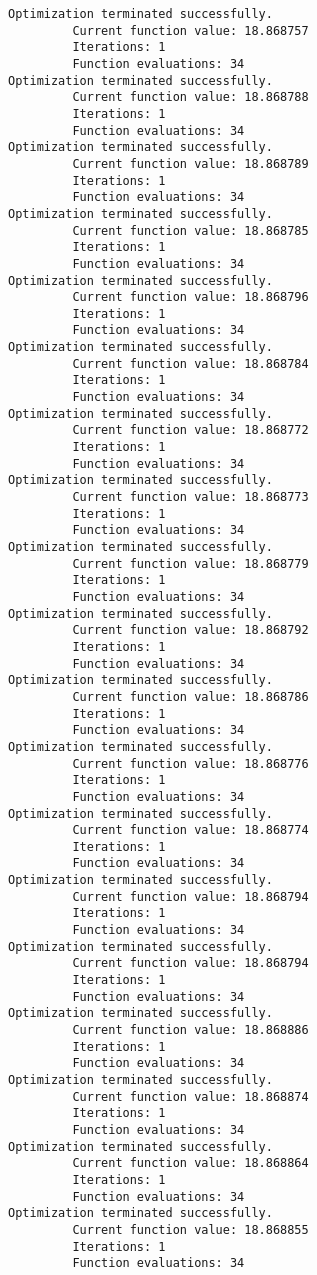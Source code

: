 \documentclass[11pt]{article}
\begin{document}
\begin{Verbatim}[commandchars=\\\{\}]
Optimization terminated successfully.
         Current function value: 18.868757
         Iterations: 1
         Function evaluations: 34
Optimization terminated successfully.
         Current function value: 18.868788
         Iterations: 1
         Function evaluations: 34
Optimization terminated successfully.
         Current function value: 18.868789
         Iterations: 1
         Function evaluations: 34
Optimization terminated successfully.
         Current function value: 18.868785
         Iterations: 1
         Function evaluations: 34
Optimization terminated successfully.
         Current function value: 18.868796
         Iterations: 1
         Function evaluations: 34
Optimization terminated successfully.
         Current function value: 18.868784
         Iterations: 1
         Function evaluations: 34
Optimization terminated successfully.
         Current function value: 18.868772
         Iterations: 1
         Function evaluations: 34
Optimization terminated successfully.
         Current function value: 18.868773
         Iterations: 1
         Function evaluations: 34
Optimization terminated successfully.
         Current function value: 18.868779
         Iterations: 1
         Function evaluations: 34
Optimization terminated successfully.
         Current function value: 18.868792
         Iterations: 1
         Function evaluations: 34
Optimization terminated successfully.
         Current function value: 18.868786
         Iterations: 1
         Function evaluations: 34
Optimization terminated successfully.
         Current function value: 18.868776
         Iterations: 1
         Function evaluations: 34
Optimization terminated successfully.
         Current function value: 18.868774
         Iterations: 1
         Function evaluations: 34
Optimization terminated successfully.
         Current function value: 18.868794
         Iterations: 1
         Function evaluations: 34
Optimization terminated successfully.
         Current function value: 18.868794
         Iterations: 1
         Function evaluations: 34
Optimization terminated successfully.
         Current function value: 18.868886
         Iterations: 1
         Function evaluations: 34
Optimization terminated successfully.
         Current function value: 18.868874
         Iterations: 1
         Function evaluations: 34
Optimization terminated successfully.
         Current function value: 18.868864
         Iterations: 1
         Function evaluations: 34
Optimization terminated successfully.
         Current function value: 18.868855
         Iterations: 1
         Function evaluations: 34

\end{Verbatim}
\end{document}
